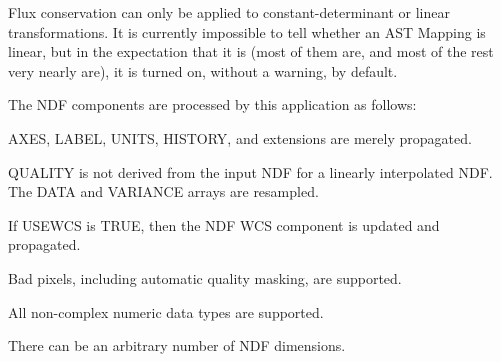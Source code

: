 \documentclass[twoside,11pt]{article}
\renewcommand{\_}{\texttt{\symbol{95}}}
\newcommand{\sstitem}{\item}
\newcommand{\sstitem}{\item}
\begin{document}
{{{         \sstitem
         Flux conservation can only be applied to constant-determinant
           or linear transformations.  It is currently impossible to tell
           whether an AST Mapping is linear, but in the expectation that
           it is (most of them are, and most of the rest very nearly are),
           it is turned on, without a warning, by default.

         \sstitem
         The NDF components are processed by this application as
           follows:

         \sstitem
            AXES, LABEL, UNITS, HISTORY, and extensions are merely
               propagated.

         \sstitem
            QUALITY is not derived from the input NDF for a linearly
               interpolated NDF. The DATA and VARIANCE arrays are
               resampled.

         \sstitem
            If USEWCS is TRUE, then the NDF WCS component is updated
               and propagated.

         \sstitem
         Bad pixels, including automatic quality masking, are supported.

         \sstitem
         All non-complex numeric data types are supported.

         \sstitem
         There can be an arbitrary number of NDF dimensions.
      }
   }
}
\end{document}
